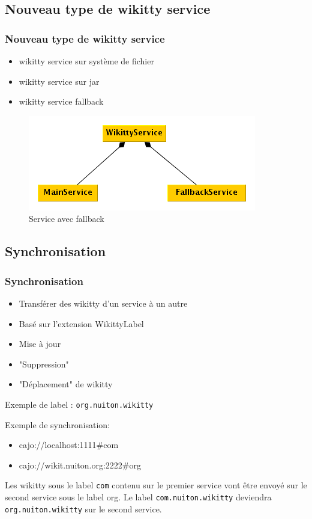 \documentclass[12pt,a4paper,utf8x]{beamer}
\begin{document}
\subsection*{Nouveau type de wikitty service}
\begin{frame}\frametitle{Nouveau type de wikitty service}
\begin{itemize}
\item wikitty service sur système de fichier
\item wikitty service sur jar
\item wikitty service fallback\pause
\end{itemize}\pause
\begin{figure}
\includegraphics[scale=0.5]{../image/multicontext.png} 
\caption{Service avec fallback}
\end{figure}
\end{frame}

\subsection*{Synchronisation}
\begin{frame}\frametitle{Synchronisation}
\begin{itemize}
\item Transférer des wikitty d'un service à un autre
\item Basé sur l'extension WikittyLabel
\item Mise à jour
\item "Suppression"
\item "Déplacement" de wikitty
\end{itemize}
\pause
Exemple de label :
\verb!org.nuiton.wikitty!
\end{frame}

\begin{frame}
Exemple de synchronisation:
\begin{itemize}
\item cajo://localhost:1111\#com
\item cajo://wikit.nuiton.org:2222\#org
\end{itemize}
\vspace{5mm}
Les wikitty sous le label \verb!com! contenu sur le premier service vont
être envoyé sur le second service sous le label org.
\vspace{5mm}
Le label \verb!com.nuiton.wikitty! deviendra \verb!org.nuiton.wikitty! sur 
le second service.
\end{frame}
\end{document}
